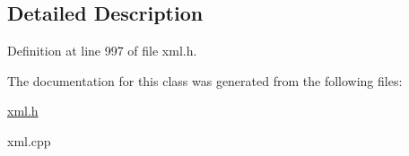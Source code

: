 \subsection{Detailed Description}


Definition at line 997 of file xml.h.



The documentation for this class was generated from the following files:\begin{DoxyCompactItemize}
\item 
\hyperlink{xml_8h}{xml.h}\item 
xml.cpp\end{DoxyCompactItemize}
